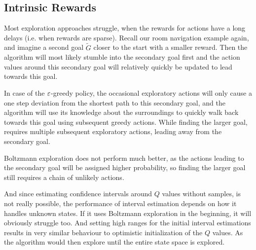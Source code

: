 \subsection{Intrinsic Rewards}
Most exploration approaches struggle, when the rewards for actions have a long delays (i.e. when rewards are sparse). Recall our room navigation example again, and imagine a second goal \(\tilde{G}\) closer to the start with a smaller reward. Then the algorithm will most likely stumble into the secondary goal first and the action values around this secondary goal will relatively quickly be updated to lead towards this goal. 

\begin{wrapfigure}{r}{5.5cm}
	\begin{center}
	\end{center}
\end{wrapfigure}

In case of the \(\varepsilon\)-greedy policy, the occasional exploratory actions will only cause a one step deviation from the shortest path to this secondary goal, and the algorithm will use its knowledge about the surroundings to quickly walk back towards this goal using subsequent greedy actions. While finding the larger goal, requires multiple subsequent exploratory actions, leading away from the secondary goal. 

Boltzmann exploration does not perform much better, as the actions leading to the secondary goal will be assigned higher probability, so finding the larger goal still requires a chain of unlikely actions. 

And since estimating confidence intervals around \(Q\) values without samples, is not really possible, the performance of interval estimation depends on how it handles unknown states. If it uses Boltzmann exploration in the beginning, it will obviously struggle too. And setting high ranges for the initial interval estimations results in very similar behaviour to optimistic initialization of the \(Q\) values. As the algorithm would then explore until the entire state space is explored. 


